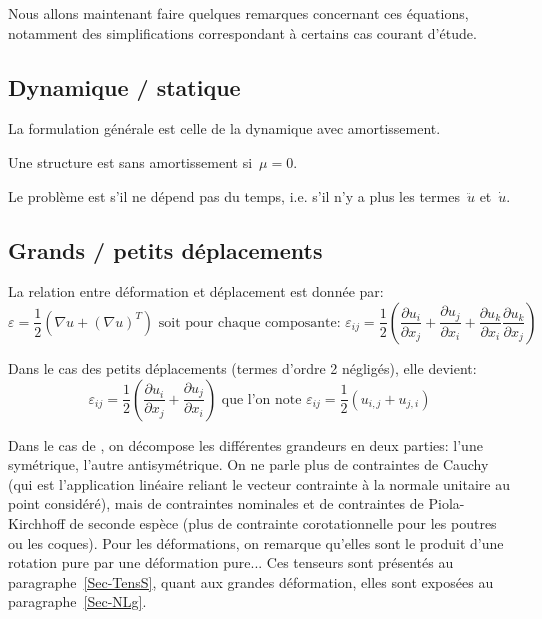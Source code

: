 \medskip
Nous allons maintenant faire quelques remarques concernant ces équations,
notamment des simplifications correspondant à certains cas courant d'étude.

\medskip
\subsection{Dynamique / statique}
La formulation générale est celle de la dynamique avec amortissement.

Une structure est sans amortissement si~$\mu=0$.

Le problème est  s'il ne dépend pas du temps,
i.e. s'il n'y a plus les termes~$\ddot{u}$ et~$\dot{u}$.

\medskip
\subsection{Grands / petits déplacements}
La relation entre déformation et déplacement est donnée par:
\begin{equation}\varepsilon=\frac12\left(\nabla u+(\nabla u)^T\right)%
\text{ soit pour chaque composante: }
\varepsilon_{ij}=\frac12\left(\frac{\partial u_i}{\partial x_j}+\frac{\partial u_j}{\partial x_i}
+\frac{\partial u_k}{\partial x_i}\frac{\partial u_k}{\partial x_j}
\right)\end{equation}

\medskip
Dans le cas des petits déplacements (termes d'ordre 2 négligés), elle devient:
\begin{equation}
\varepsilon_{ij}=\frac12\left(\frac{\partial u_i}{\partial x_j}+\frac{\partial u_j}{\partial x_i}\right)
\text{ que l'on note }
\varepsilon_{ij}=\frac12(u_{i,j}+u_{j,i})
\end{equation}

Dans le cas de , on décompose les différentes grandeurs
en deux parties: l'une symétrique, l'autre antisymétrique.
On ne parle plus de contraintes de Cauchy (qui est l'application linéaire reliant le
vecteur contrainte à la normale unitaire au point considéré), mais
de contraintes nominales et de contraintes de Piola-Kirchhoff de seconde espèce (plus
de contrainte corotationnelle pour les poutres ou les coques).
Pour les déformations, on remarque qu'elles sont le produit d'une rotation pure
par une déformation pure... 
Ces tenseurs sont présentés au paragraphe~\ref{Sec-TensS}, quant
aux grandes déformation, elles sont exposées au paragraphe~\ref{Sec-NLg}.


